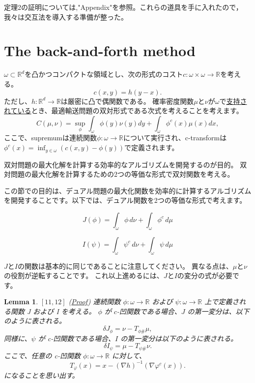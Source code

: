\documentclass{jsarticle}
\newtheorem{lem}[thm]{Lemma}
\theoremstyle{definition}
\begin{document}
\vspace\baselineskip
定理2の証明については,"Appendix"を参照。これらの道具を手に入れたので，我々は交互法を導入する準備が整った。


\section{The back-and-forth method}
\label{sect:the back-and-forth method}

$\omega \subset \mathbb{R}^d$を凸かつコンパクトな領域とし、次の形式のコスト$c: \omega \times \omega \to \mathbb{R}$を考える。
$$
c(x,y) = h(y - x).
$$
ただし、$h: \mathbb{R}^d \to \mathbb{R}$は厳密に凸で偶関数である。
確率密度関数$\mu$と$\nu$が$\omega$で\hyperlink{支持されている}{支持されている}とき、最適輸送問題の双対形式である次式を考えることを考えます。
\begin{equation}
  C(\mu,\nu) = \sup_{\phi}\int_{\omega}\phi(y)\nu(y)dy + \int_{\omega}\phi^c(x)\mu(x)dx,
\end{equation}
ここで、supremumは連続関数$\phi:\omega \to \mathbb{R}$について実行され、c-transformは$\phi^c(x) = \inf_{y\in\omega}(c(x,y)-\phi(y))$で定義されます。

双対問題の最大化解を計算する効率的なアルゴリズムを開発するのが目的。
双対問題の最大化解を計算するための2つの等価な形式で双対関数を考える。


この節での目的は、デュアル問題の最大化関数を効率的に計算するアルゴリズムを開発することです。以下では、デュアル関数を2つの等価な形式で考えます。

\begin{equation}
  J(\phi) = \int_\omega \phi \, d\nu + \int_\omega \phi^c \, d\mu 
\end{equation}

\begin{equation}
  I(\psi) = \int_\omega \psi^c \, d\nu + \int_\omega \psi \, d\mu
\end{equation}

$J$と$I$の関数は基本的に同じであることに注意してください。
異なる点は、$\mu$と$\nu$の役割が逆転することです。
これ以上進めるには、$J$と$I$の変分の式が必要です。

\begin{lem}
  $\left[11,12 \right]$ 
  \label{lem:variation}
  (\hyperlink{proof:lem:variation}{Proof})
  連続関数 $\phi: \omega \rightarrow \mathbb{R}$ および $\psi: \omega \rightarrow \mathbb{R}$ 上で定義される関数 J および I を考える。
  $\phi$ が $c$-凹関数である場合、$J$ の第一変分は、以下のように表される。
  $$
  \delta J_\phi = \nu - T_{\phi \#} \mu,
  $$
  同様に、$\psi$ が c-凹関数である場合、$I$ の第一変分は以下のように表される。
  $$
  \delta I_\psi = \mu - T_{\psi \# }\nu.
  $$
  ここで、任意の c-凹関数 $\phi: \omega \rightarrow \mathbb{R}$ に対して、
  $$
  T_\varphi(x) = x - (\nabla h)^{-1}(\nabla \varphi^c(x)).
  $$
  になることを思い出す。
\end{lem}
\end{document}
